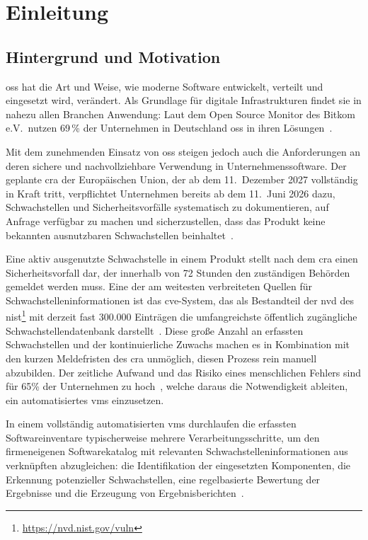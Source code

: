 \chapter{Einleitung}\label{ch:einleitung}


\section{Hintergrund und Motivation}\label{sec:hintergrund-motivation}

\acrfull{oss} hat die Art und Weise, wie moderne Software entwickelt, verteilt und eingesetzt wird, verändert.
Als Grundlage für digitale Infrastrukturen findet sie in nahezu allen Branchen Anwendung:
Laut dem Open Source Monitor des Bitkom e.V.\ nutzen 69\,\% der Unternehmen in Deutschland \acrshort{oss} in ihren Lösungen\ \autocite{OpenSourceMonitorWintergerst}.

Mit dem zunehmenden Einsatz von \acrshort{oss} steigen jedoch auch die Anforderungen an deren sichere und nachvollziehbare Verwendung in Unternehmenssoftware.
Der geplante \acrfull{cra} der Europäischen Union, der ab dem 11.\ Dezember 2027 vollständig in Kraft tritt,
verpflichtet Unternehmen bereits ab dem 11.\ Juni 2026 dazu, Schwachstellen und Sicherheitsvorfälle systematisch zu dokumentieren,
auf Anfrage verfügbar zu machen und sicherzustellen, dass das Produkt keine bekannten ausnutzbaren Schwachstellen beinhaltet\ \autocite{eu2024cra}.

Eine aktiv ausgenutzte Schwachstelle in einem Produkt stellt nach dem \acrshort{cra} einen Sicherheitsvorfall dar, der innerhalb von 72 Stunden den zuständigen Behörden gemeldet werden muss.
Eine der am weitesten verbreiteten Quellen für Schwachstelleninformationen ist das \acrfull{cve}-System, das als Bestandteil der \acrfull{nvd} des \acrfull{nist}\footnote{\url{https://nvd.nist.gov/vuln}} mit derzeit fast 300.000 Einträgen die umfangreichste öffentlich zugängliche Schwachstellendatenbank darstellt\ \autocite{nvd12mai2025dashboard}.
Diese große Anzahl an erfassten Schwachstellen und der kontinuierliche Zuwachs machen es in Kombination mit den kurzen Meldefristen des \acrshort{cra} unmöglich, diesen Prozess rein manuell abzubilden.
Der zeitliche Aufwand und das Risiko eines menschlichen Fehlers sind für 65\% der Unternehmen zu hoch\ \autocite{OpenSourceMonitorWintergerst}, welche daraus die Notwendigkeit ableiten, ein automatisiertes \acrfull{vms} einzusetzen.

In einem vollständig automatisierten \acrshort{vms} durchlaufen die erfassten Softwareinventare typischerweise mehrere Verarbeitungsschritte, um den firmeneigenen Softwarekatalog mit relevanten Schwachstelleninformationen aus verknüpften  abzugleichen:
die Identifikation der eingesetzten Komponenten, die Erkennung potenzieller Schwachstellen, eine regelbasierte Bewertung der Ergebnisse und die Erzeugung von Ergebnisberichten\ \autocite{Idrissi_Sebai_Faroukhi_Mahouachi_2024}.

